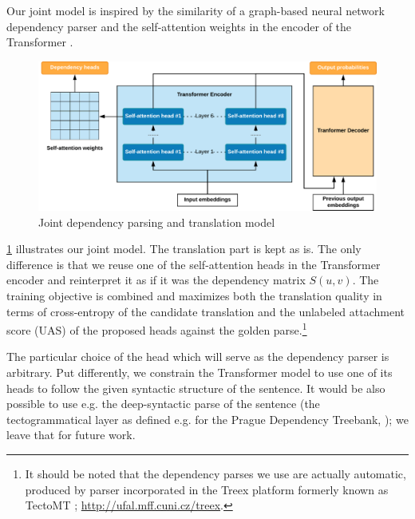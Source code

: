 Our joint model is inspired by the similarity of a graph-based neural network dependency parser \cite{DBLP:journals/corr/DozatM16} and the self-attention weights in the encoder of the Transformer \cite{DBLP:conf/nips/VaswaniSPUJGKP17}.

\begin{figure}
    \includegraphics[width=\linewidth]{img/Joint_Translation_DepParse}
    \caption{Joint dependency parsing and translation model}
    \label{fig:joint_trans_depparse}
\end{figure}

\cref{fig:joint_trans_depparse} illustrates our joint model. The translation
part is kept as is. The only difference is that we reuse one of the
self-attention heads in the Transformer encoder and reinterpret it as if it was
the dependency matrix $S(u, v)$. The training objective is combined and
maximizes both the translation quality in terms of cross-entropy of the
candidate translation and the unlabeled attachment score (UAS) of the proposed
heads against the golden parse.\footnote{It should be noted that the dependency
parses we use are actually automatic, produced by
 parser incorporated in the Treex
platform formerly known as TectoMT ;
\url{http://ufal.mff.cuni.cz/treex}.}

The particular choice of the head which will serve as the dependency parser is
arbitrary. Put differently, we constrain the Transformer model to use one of its
heads to follow the given syntactic structure of the sentence. It would be also
possible to use e.g. the deep-syntactic parse of the sentence (the
tectogrammatical layer as defined e.g. for the Prague Dependency Treebank,
); we leave that for future work.
